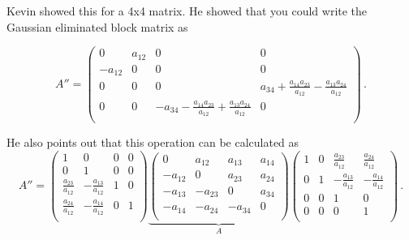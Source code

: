 Kevin showed this for a 4x4 matrix. He showed that you could write the Gaussian eliminated block matrix as

\begin{equation}
A'' = \left (
\begin{array}{cccc}
0 & a_{12} & 0 & 0 \\
-a_{12}& 0 & 0 & 0 \\
0& 0 & 0 &
 a_{34}+\frac{a_{14}a_{23}}{a_{12}}-\frac{a_{13}a_{24}} {a_{12}} \\
0& 0 &
 -a_{34}-\frac{a_{14}a_{23}}{a_{12}}+\frac{a_{13}a_{24}} {a_{12}}
 &0 \\
\end{array}
\right )  \,.
\end{equation}

He also points out that this operation can be calculated as
\begin{equation}
\label{trans}
A'' =
\left (
\begin{array}{cccc}
1 & 0 & 0 & 0\\
0 & 1 & 0 & 0\\
\frac{a_{23}}{a_{12}} &-\frac{a_{13}}{a_{12}}& 1 & 0\\
\frac{a_{24}}{a_{12}} & -\frac{a_{14}}{a_{12}}&0 & 1\\
\end{array}
\right )
\underbrace{
\left (
\begin{array}{cccc}
0 & a_{12} & a_{13} & a_{14} \\
-a_{12}& 0 & a_{23} & a_{24} \\
-a_{13}& -a_{23} & 0 & a_{34} \\
-a_{14}& -a_{24} & -a_{34} &0 \\
\end{array}
\right )
}_{A}
\left (
\begin{array}{cccc}
1 & 0 & \frac{a_{23}}{a_{12}} & \frac{a_{24}}{a_{12}}\\
0 & 1 & -\frac{a_{13}}{a_{12}} & -\frac{a_{14}}{a_{12}}\\
0 & 0 & 1 & 0\\
0 & 0 & 0 & 1\\
\end{array}
\right )  \,.
\end{equation}
